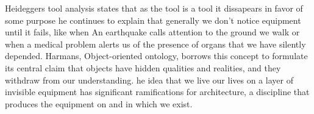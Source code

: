 Heideggers tool analysis states that as the tool is a tool it dissapears in favor of some purpose he continues to explain that generally we don't notice equipment until it fails, like when An earthquake calls attention to the ground we walk or when a medical problem alerts us of the presence of organs that we have silently depended\cite{Harman2011}.
Harmans, Object-oriented ontology, borrows this concept to formulate its central claim that objects have hidden qualities and realities, and they withdraw from our understanding.\cite{Gage2015}
he idea that we live our lives on a layer of invisible equipment has significant ramifications for architecture, a discipline that produces the equipment on and in which we exist.\cite{Gage2015}
